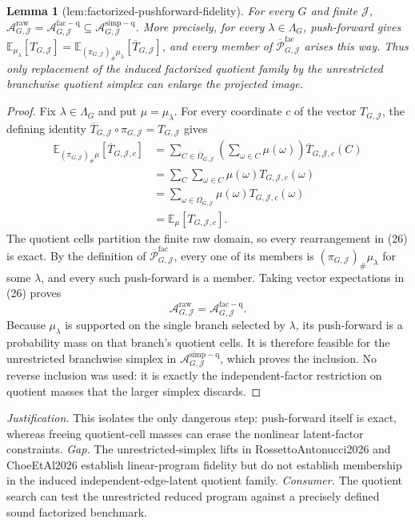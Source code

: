 \documentclass{article}
\newtheorem{lemma}{Lemma}
\begin{document}
\begin{lemma}[lem:factorized-pushforward-fidelity]\label{lem:factorized-pushforward-fidelity}
For every \(G\) and finite \(\mathcal J\), \(\mathcal A_{G,\mathcal J}^{\mathrm{raw}}=\mathcal A_{G,\mathcal J}^{\mathrm{fac-q}}\subseteq\mathcal A_{G,\mathcal J}^{\mathrm{simp-q}}\). More precisely, for every \(\lambda\in\Lambda_G\), push-forward gives \(\mathbb E_{\mu_{\lambda}}[T_{G,\mathcal J}]=\mathbb E_{(\pi_{G,\mathcal J})_{\#}\mu_{\lambda}}[\overline T_{G,\mathcal J}]\), and every member of \(\overline{\mathcal P}_{G,\mathcal J}^{\mathrm{fac}}\) arises this way. Thus only replacement of the induced factorized quotient family by the unrestricted branchwise quotient simplex can enlarge the projected image.
\end{lemma}
\begin{proof}
Fix \(\lambda\in\Lambda_G\) and put \(\mu=\mu_\lambda\).  For every coordinate \(c\) of the vector \(T_{G,\mathcal J}\), the defining identity \(\overline T_{G,\mathcal J}\circ\pi_{G,\mathcal J}=T_{G,\mathcal J}\) gives
\[
\begin{aligned}
\mathbb E_{(\pi_{G,\mathcal J})_\#\mu}[\overline T_{G,\mathcal J,c}]
&=\sum_{C\in\overline\Omega_{G,\mathcal J}}\left(\sum_{\omega\in C}\mu(\omega)\right)\overline T_{G,\mathcal J,c}(C)\\
&=\sum_C\sum_{\omega\in C}\mu(\omega)T_{G,\mathcal J,c}(\omega)\\
&=\sum_{\omega\in\Omega_{G,\mathcal J}}\mu(\omega)T_{G,\mathcal J,c}(\omega)\\
&=\mathbb E_\mu[T_{G,\mathcal J,c}].
\end{aligned}
\tag{26}
\]
The quotient cells partition the finite raw domain, so every rearrangement in (26) is exact.  By the definition of \(\overline{\mathcal P}_{G,\mathcal J}^{\mathrm{fac}}\), every one of its members is \((\pi_{G,\mathcal J})_\#\mu_\lambda\) for some \(\lambda\), and every such push-forward is a member.  Taking vector expectations in (26) proves
\[
\mathcal A_{G,\mathcal J}^{\mathrm{raw}}
=\mathcal A_{G,\mathcal J}^{\mathrm{fac-q}}.
\]
Because \(\mu_\lambda\) is supported on the single branch selected by \(\lambda\), its push-forward is a probability mass on that branch's quotient cells.  It is therefore feasible for the unrestricted branchwise simplex in \(\mathcal A_{G,\mathcal J}^{\mathrm{simp-q}}\), which proves the inclusion.  No reverse inclusion was used: it is exactly the independent-factor restriction on quotient masses that the larger simplex discards.
\end{proof}
\par\smallskip\noindent \textit{Justification.} This isolates the only dangerous step: push-forward itself is exact, whereas freeing quotient-cell masses can erase the nonlinear latent-factor constraints. \textit{Gap.} The unrestricted-simplex lifts in RossettoAntonucci2026 and ChoeEtAl2026 establish linear-program fidelity but do not establish membership in the induced independent-edge-latent quotient family. \textit{Consumer.} The quotient search can test the unrestricted reduced program against a precisely defined sound factorized benchmark.
\end{document}
